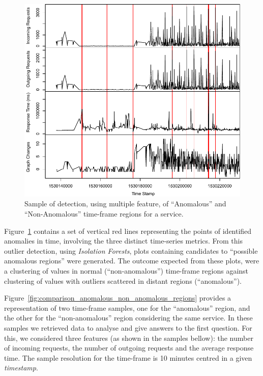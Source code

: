 \begin{figure}
  \centering\includegraphics[width=1.0\linewidth]{images/multi_feature_anomaly_detection.pdf}
  \captionsetup{justification=centering}
  \caption{Sample of detection, using multiple feature, of ``Anomalous'' and ``Non-Anomalous'' time-frame regions for a service.}
  \label{fig:service_isolation_forest_detections}
\end{figure}

\newpage

Figure~\ref{fig:service_isolation_forest_detections} contains a set of vertical red lines representing the points of identified anomalies in time, involving the three distinct time-series metrics. From this outlier detection, using \emph{Isolation Forests}, plots containing candidates to ``possible anomalous regions'' were generated. The outcome expected from these plots, were a clustering of values in normal (``non-anomalous'') time-frame regions against clustering of values with outliers scattered in distant regions (``anomalous'').

Figure~\ref{fig:comparison_anomalous_non_anomalous_regions} provides a representation of two time-frame samples, one for the ``anomalous'' region, and the other for the ``non-anomalous'' region considering the same service. In these samples we retrieved data to analyse and give answers to the first question. For this, we considered three features (as shown in the samples bellow): the number of incoming requests, the number of outgoing requests and the average response time. The sample resolution for the time-frame is 10 minutes centred in a given \emph{timestamp}.

